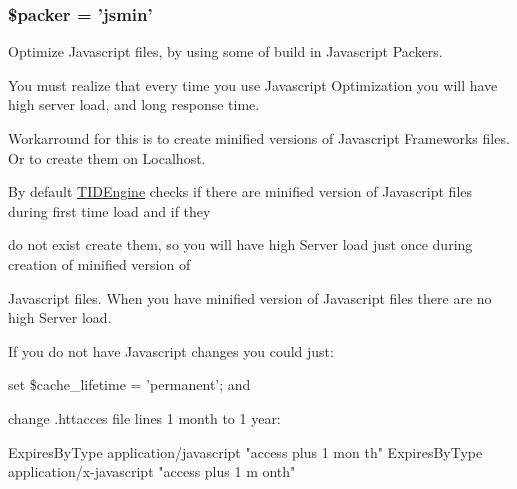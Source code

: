 \hypertarget{group__js__cache__settings_ga16b8a20321620dbef3a8deb7462ef4f4}{
\subsubsection[{\$packer}]{\setlength{\rightskip}{0pt plus 5cm}\$packer = 'jsmin'}}
\label{group__js__cache__settings_ga16b8a20321620dbef3a8deb7462ef4f4}
Optimize Javascript files, by using some of build in Javascript Packers. \par
 You must realize that every time you use Javascript Optimization you will have high server load, and long response time.\par
\par
 Workarround for this is to create minified versions of Javascript Frameworks files. Or to create them on Localhost.\par
\par
 By default \hyperlink{class_t_i_d_engine}{TIDEngine} checks if there are minified version of Javascript files during first time load and if they \par
 do not exist create them, so you will have high Server load just once during creation of minified version of \par
 Javascript files. When you have minified version of Javascript files there are no high Server load.\par
 If you do not have Javascript changes you could just:
\begin{DoxyItemize}
\item set \$cache\_\-lifetime = 'permanent'; and
\item change .httacces file lines 1 month to 1 year:\par
\par
 
\begin{DoxyCode}
                          ExpiresByType application/javascript "access plus 1 mon
      th"
                          ExpiresByType application/x-javascript "access plus 1 m
      onth"
\end{DoxyCode}

\end{DoxyItemize}


